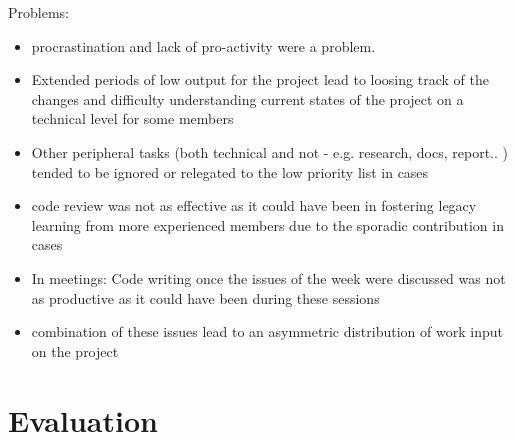 Problems:
\begin{itemize}
    \item procrastination and lack of pro-activity were a problem.
    \item Extended periods of low output for the project lead to loosing track of the changes and difficulty understanding current states of the project on a technical level for some members
    \item Other peripheral tasks (both technical and not - e.g. research, docs, report.. ) tended to be ignored or relegated to the low priority list in cases
    \item code review was not as effective as it could have been in fostering legacy learning from more experienced members due to the sporadic contribution in cases
    \item In meetings: Code writing once the issues of the week were discussed was not as productive as it could have been during these sessions
    \item combination of these issues lead to an asymmetric distribution of work input on the project
\end{itemize}

\section{Evaluation}
